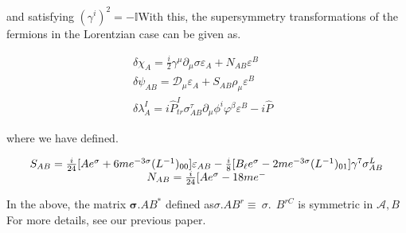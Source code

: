 \documentclass{article}
\begin{document}
and satisfying $( \gamma ^ { i } ) ^ { 2 } = - \mathbb { I }$With this, the supersymmetry transformations of the fermions
in the Lorentzian case can be given as.


\begin{equation}
\begin{array} { c } { \delta \chi _ { A } = \frac i 2 \gamma ^ { \mu } \partial _ { \mu } \sigma \varepsilon _ { A } + N _ { A B } \varepsilon ^ { B } \qquad } \\ { \delta \psi _ { A B } = \mathcal { D } _ { \mu } \varepsilon _ { A } + S _ { A B } \rho _ { \mu } \varepsilon ^ { B } \qquad } \\ { \delta \lambda _ { A } ^ { I } = i \hat { P } _ { t r } ^ { I } \sigma _ { A B } ^ { \tau } \partial _ { \mu } \phi ^ { i } \varphi ^ { \beta } \varepsilon ^ { B } - i \hat { P}}\end{array}
\end{equation}


where we have defined.


\begin{equation}
\begin{array} { c c } { S _ { A B } = \frac { i } { 2 4 } [ A e ^ { \sigma } + 6 m e ^ { - 3 \sigma } ( L ^ { - 1 } ) _ { 0 0 } ] \varepsilon _ { A B } - \frac { i } { 8 } [ B _ { \ell } e ^ { \sigma } - 2 m e ^ { - 3 \sigma } ( L ^ { - 1 } ) _ { 0 1 } ] \gamma ^ { 7 } \sigma _ { A B } ^ { L } } \\ { N _ { A B } = \frac { i } { 2 4 } [ A e ^ { \sigma } - 1 8 m e ^ { -}}\end{array}
\end{equation}


In the above, the matrix $\boldsymbol { \sigma } . { A B } ^ { * }$ defined as$\sigma . { A B } ^ { r } \equiv ~ \sigma . { ~ ~ B } ^ { r C } \!$ is symmetric in ${ \mathcal { A } }, B$ For more
details, see our previous paper.
\end{document}
